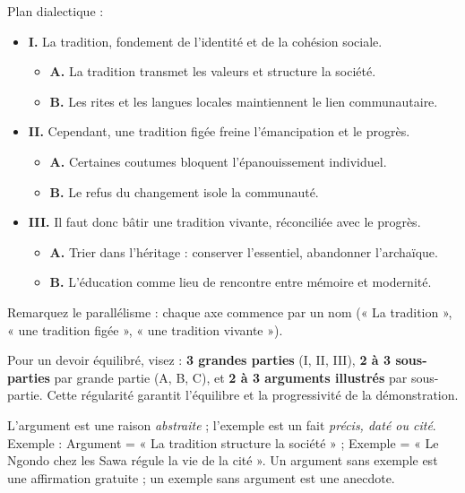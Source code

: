 \documentclass[11pt]{article}
\newcommand{\cle}[1]{{\popxbold\color{popdark}#1}}
\begin{document}
\begin{exemplebox}
Plan dialectique :
\begin{itemize}
\item \textbf{I.} La tradition, fondement de l'identité et de la cohésion sociale.
\begin{itemize}
\item \textbf{A.} La tradition transmet les valeurs et structure la société.
\item \textbf{B.} Les rites et les langues locales maintiennent le lien communautaire.
\end{itemize}
\item \textbf{II.} Cependant, une tradition figée freine l'émancipation et le progrès.
\begin{itemize}
\item \textbf{A.} Certaines coutumes bloquent l'épanouissement individuel.
\item \textbf{B.} Le refus du changement isole la communauté.
\end{itemize}
\item \textbf{III.} Il faut donc bâtir une tradition vivante, réconciliée avec le progrès.
\begin{itemize}
\item \textbf{A.} Trier dans l'héritage : conserver l'essentiel, abandonner l'archaïque.
\item \textbf{B.} L'éducation comme lieu de rencontre entre mémoire et modernité.
\end{itemize}
\end{itemize}
Remarquez le parallélisme : chaque axe commence par un nom (« La tradition », « une tradition figée », « une tradition vivante »).
\end{exemplebox}

\begin{methode}
Pour un devoir équilibré, visez : \textbf{3 grandes parties} (I, II, III), \textbf{2 à 3 sous-parties} par grande partie (A, B, C), et \textbf{2 à 3 arguments illustrés} par sous-partie. Cette régularité garantit l'équilibre et la progressivité de la démonstration.
\end{methode}

\begin{attention}
L'\cle{argument} est une raison \emph{abstraite} ; l'\cle{exemple} est un fait \emph{précis, daté ou cité}. Exemple : Argument = « La tradition structure la société » ; Exemple = « Le Ngondo chez les Sawa régule la vie de la cité ». Un argument sans exemple est une affirmation gratuite ; un exemple sans argument est une anecdote.
\end{attention}
\end{document}

